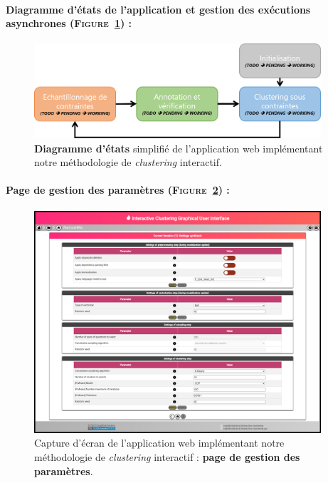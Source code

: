 	\paragraph{Diagramme d'états de l'application et gestion des exécutions asynchrones (\textsc{Figure~\ref{figure:C-WEB-APPLICATION-DIAGRAMME-ETATS}}) :}
	
		\begin{figure}[H]
			\centering
			\includegraphics[width=0.95\textwidth]{figures/interactive-clustering-application-diagramme-etats}
			\caption{
				\textbf{Diagramme d'états} simplifié de l'application web implémentant notre méthodologie de \textit{clustering} interactif.
			}
			\label{figure:C-WEB-APPLICATION-DIAGRAMME-ETATS}
		\end{figure}
	
	
	\newpage
	\paragraph{Page de gestion des paramètres (\textsc{Figure~\ref{figure:C-WEB-APPLICATION-PARAMETRAGE}}) :}
	
		\begin{figure}[H]
			\centering
			\includegraphics[width=0.95\textwidth]{figures/interactive-clustering-application-parametres}
			\caption{
				Capture d'écran de l'application web implémentant notre méthodologie de \textit{clustering} interactif : \textbf{page de gestion des paramètres}.
			}
			\label{figure:C-WEB-APPLICATION-PARAMETRAGE}
		\end{figure}
	
